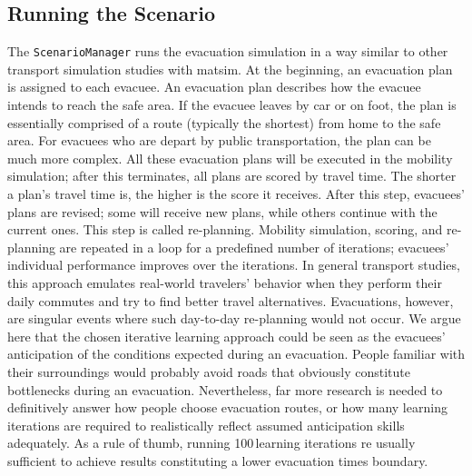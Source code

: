 \subsection{Running the Scenario}
The \lstinline|ScenarioManager| runs the evacuation simulation in a way similar to other transport simulation studies with \gls{matsim}. 
At the beginning, an evacuation plan is assigned to each evacuee. 
An evacuation plan describes how the evacuee intends to reach the safe area.
If the evacuee leaves by car or on foot, the plan is essentially comprised of a route (typically the shortest) from home to the safe area. For evacuees who are depart by public transportation, the plan can be much more complex. All these evacuation plans will be executed in the mobility simulation; after this terminates, all plans are scored by travel time. 
The shorter a plan's travel time is, the higher is the score it receives. After this step, evacuees' plans are revised; some will receive new plans, while others continue with the current ones. This step is called re-planning. Mobility simulation, scoring, and re-planning are repeated in a loop for a predefined number of iterations; evacuees' individual performance improves over the iterations. 
In general transport studies, this approach emulates real-world travelers' behavior when they perform their daily commutes and try to find better travel alternatives. Evacuations, however, are singular events where such day-to-day re-planning would not occur. We argue here that the chosen iterative learning approach could be seen as the evacuees' anticipation of the conditions expected during an evacuation. 
People familiar with their surroundings would probably avoid roads that obviously constitute bottlenecks during an evacuation. Nevertheless, far more research is needed to definitively answer how people choose evacuation routes, or how many learning iterations are required to realistically reflect assumed anticipation skills adequately. As a rule of thumb, running 100\,learning iterations re usually sufficient to achieve results constituting a lower evacuation times boundary.   

